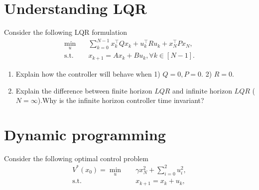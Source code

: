 \section{Understanding LQR}
Consider the following LQR formulation
\begin{align*}
    \min_u\quad &\sum_{k=0}^{N-1}x_{k}^{\top}Qx_{k} + u_{k}^{\top}Ru_k + x_{N}^{\top}Px_N,\\
    \text{s.t.}\quad &x_{k+1} = Ax_k + Bu_k, \forall k \in [N-1].
\end{align*}
\begin{enumerate}
    \item Explain how the controller will behave when 1) $Q = 0, P = 0$. 2) $R= 0$.\vspace{3\baselineskip}
    \item Explain the difference between finite horizon $LQR$ and infinite horizon $LQR$ ($N = \infty$).Why is the infinite horizon controller time invariant?\vspace{3\baselineskip}
\end{enumerate}
\section{Dynamic programming}
Consider the following optimal control problem
\begin{align*}
    V^*(x_0) = \min_u \quad &\gamma x_N^2 + \sum_{i = 0}^{2}u_i^2,\\
    \text{s.t.}\quad&x_{k+1} = x_k+ u_k,
\end{align*}

